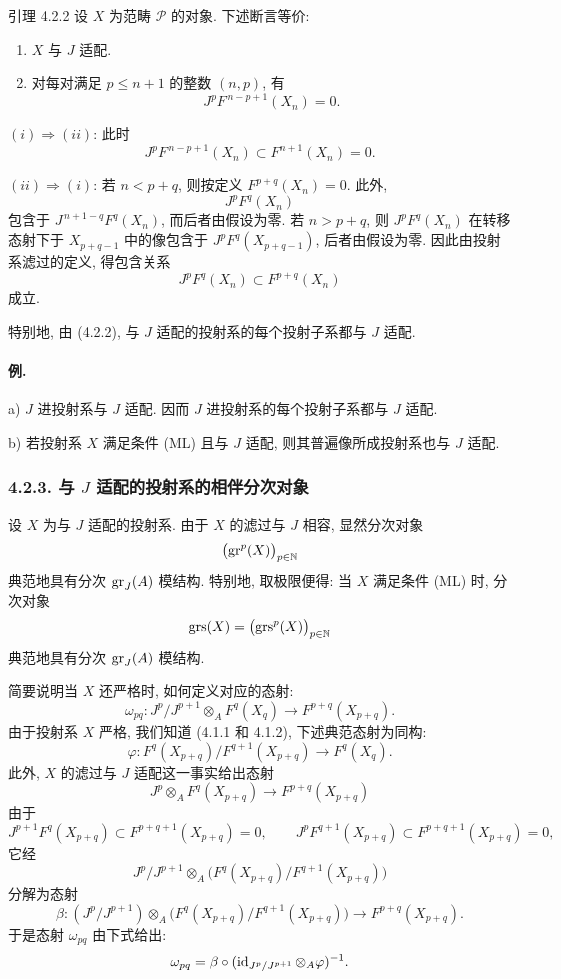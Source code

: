 \begin{statement}{引理 4.2.2}
设 \(X\) 为范畴 \(\mathcal P\) 的对象. 下述断言等价:
\begin{enumerate}[label=\textup{(\roman*)}]
\item \(X\) 与 \(J\) 适配.
\item 对每对满足 \(p\le n+1\) 的整数 \((n,p)\), 有
\[
J^pF^{\,n-p+1}(X_n)=0 .
\]
\end{enumerate}
\end{statement}

\begin{prooftext}
\((i)\Rightarrow(ii)\): 此时
\[
J^pF^{\,n-p+1}(X_n)\subset F^{n+1}(X_n)=0.
\]

\((ii)\Rightarrow(i)\): 若 \(n<p+q\), 则按定义 \(F^{p+q}(X_n)=0\). 此外,
\[
J^pF^q(X_n)
\]
包含于 \(J^{\,n+1-q}F^q(X_n)\), 而后者由假设为零. 若 \(n>p+q\), 则 \(J^pF^q(X_n)\) 在转移态射下于 \(X_{p+q-1}\) 中的像包含于 \(J^pF^q(X_{p+q-1})\), 后者由假设为零. 因此由投射系滤过的定义, 得包含关系
\[
J^pF^q(X_n)\subset F^{p+q}(X_n)
\]
成立.

特别地, 由 (4.2.2), 与 \(J\) 适配的投射系的每个投射子系都与 \(J\) 适配.
\end{prooftext}

\paragraph{例.}
a) \(J\) 进投射系与 \(J\) 适配. 因而 \(J\) 进投射系的每个投射子系都与 \(J\) 适配.

b) 若投射系 \(X\) 满足条件 (ML) 且与 \(J\) 适配, 则其普遍像所成投射系也与 \(J\) 适配.

\subsubsection*{4.2.3. 与 \(J\) 适配的投射系的相伴分次对象}
设 \(X\) 为与 \(J\) 适配的投射系. 由于 \(X\) 的滤过与 \(J\) 相容, 显然分次对象
\[
\bigl(\operatorname{gr}^p(X)\bigr)_{p\in\mathbb N}
\]
典范地具有分次 \(\operatorname{gr}_J(A)\) 模结构. 特别地, 取极限便得: 当 \(X\) 满足条件 (ML) 时, 分次对象
\[
\operatorname{grs}(X)=\bigl(\operatorname{grs}^p(X)\bigr)_{p\in\mathbb N}
\]
典范地具有分次 \(\operatorname{gr}_J(A)\) 模结构.

简要说明当 \(X\) 还严格时, 如何定义对应的态射:
\[
\omega_{pq}: J^p/J^{p+1}\otimes_A F^q(X_q)\longrightarrow F^{p+q}(X_{p+q}).
\]
由于投射系 \(X\) 严格, 我们知道 (4.1.1 和 4.1.2), 下述典范态射为同构:
\[
\varphi:F^q(X_{p+q})/F^{q+1}(X_{p+q})\longrightarrow F^q(X_q).
\]
此外, \(X\) 的滤过与 \(J\) 适配这一事实给出态射
\[
J^p\otimes_A F^q(X_{p+q})\longrightarrow F^{p+q}(X_{p+q})
\]
由于
\[
J^{p+1}F^q(X_{p+q})\subset F^{p+q+1}(X_{p+q})=0,\qquad
J^pF^{q+1}(X_{p+q})\subset F^{p+q+1}(X_{p+q})=0,
\]
它经
\[
J^p/J^{p+1}\otimes_A
\bigl(F^q(X_{p+q})/F^{q+1}(X_{p+q})\bigr)
\]
分解为态射
\[
\beta:(J^p/J^{p+1})\otimes_A
\bigl(F^q(X_{p+q})/F^{q+1}(X_{p+q})\bigr)
\longrightarrow F^{p+q}(X_{p+q}).
\]
于是态射 \(\omega_{pq}\) 由下式给出:
\[
\omega_{pq}=\beta\circ(\operatorname{id}_{J^p/J^{p+1}}\otimes_A\varphi)^{-1}.
\]

